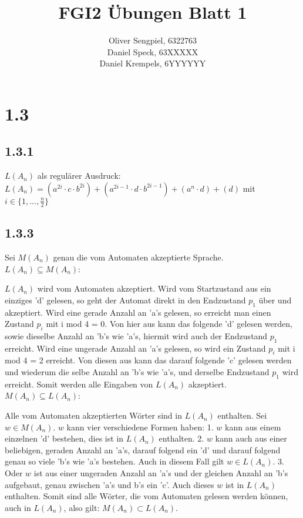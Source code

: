 \documentclass{article}
\title{FGI2 Übungen Blatt 1}
\author{Oliver Sengpiel, 6322763 \\
	Daniel Speck, 63XXXXX \\
	Daniel Krempels, 6YYYYYY}
\begin{document}
\maketitle

\section{1.3}
\subsection{1.3.1}
$L(A_n)$ als regulärer Ausdruck: \\
$L(A_n) = (a^{2i}\cdot c\cdot b^{2i}) + (a^{2i-1}\cdot d\cdot b^{2i-1}) +
(a^{n}\cdot d) + (d)$ mit $i \in \{1, \dots, \frac{n}{2} \}$

\subsection{1.3.3}
Sei $M(A_n)$ genau die vom Automaten akzeptierte Sprache. \\
$L(A_n) \subseteq M(A_n)$: 

$L(A_n)$ wird vom Automaten akzeptiert. Wird vom Startzustand aus ein einziges 'd' gelesen, so geht der Automat direkt in den Endzustand $p_1$ über und akzeptiert. Wird eine gerade Anzahl an 'a's gelesen, so erreicht man einen Zustand $p_i$ mit i mod 4 = 0. Von hier aus kann das folgende 'd' gelesen werden, sowie dieselbe Anzahl an 'b's wie 'a's, hiermit wird auch der Endzustand $p_1$ erreicht. Wird eine ungerade Anzahl an 'a's gelesen, so wird ein Zustand $p_i$ mit i mod 4 = 2 erreicht. Von diesen aus kann das darauf folgende 'c' gelesen werden und wiederum die selbe Anzahl an 'b's wie 'a's, und derselbe Endzustand $p_1$ wird erreicht. Somit werden alle Eingaben von $L(A_n)$ akzeptiert. \\
$M(A_n) \subseteq L(A_n)$: 

Alle vom Automaten akzeptierten Wörter sind in $L(A_n)$ enthalten. Sei $w \in M(A_n)$. $w$ kann vier verschiedene Formen haben: 1. $w$ kann aus einem einzelnen 'd' bestehen, dies ist in $L(A_n)$ enthalten. 2. $w$ kann auch aus einer beliebigen, geraden Anzahl an 'a's, darauf folgend ein 'd' und darauf folgend genau so viele 'b's wie 'a's bestehen. Auch in diesem Fall gilt $w \in L(A_n)$. 3. Oder $w$ ist aus einer ungeraden Anzahl an 'a's und der gleichen Anzahl an 'b's aufgebaut, genau zwischen 'a's und b's ein 'c'. Auch dieses $w$ ist in $L(A_n)$ enthalten. Somit sind alle Wörter, die vom Automaten gelesen werden können, auch in $L(A_n)$, also gilt: $M(A_n) \subset L(A_n)$. 
\end{document}

